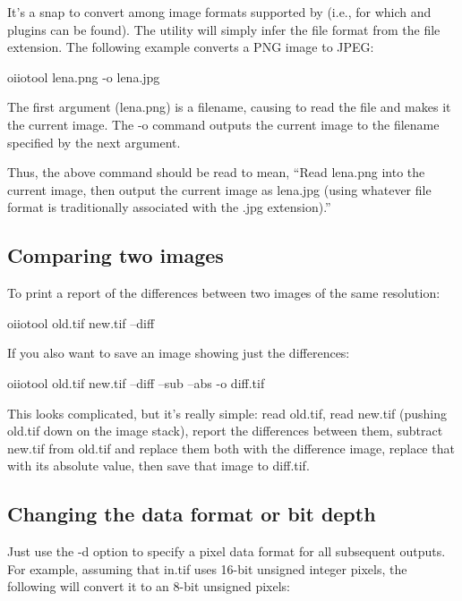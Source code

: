 It's a snap to convert among image formats supported by \product
(i.e., for which \ImageInput and \ImageOutput plugins can be found).
The \oiiotool utility will simply infer the file format from the
file extension. The following example converts a PNG image to JPEG:

\begin{code}
    oiiotool lena.png -o lena.jpg
\end{code}

The first argument ({\cf lena.png}) is a filename, causing \oiiotool to
read the file and makes it the current image.  The {\cf -o} command
outputs the current image to the filename specified by the next
argument.

Thus, the above command should be read to mean, ``Read {\cf lena.png}
into the current image, then output the current image as {\cf lena.jpg}
(using whatever file format is traditionally associated with the {\cf
  .jpg} extension).''


\subsection*{Comparing two images}

To print a report of the differences between two images of the same
resolution:

\begin{code}
    oiiotool old.tif new.tif --diff
\end{code}

\noindent If you also want to save an image showing just the differences:

\begin{code}
    oiiotool old.tif new.tif --diff --sub --abs -o diff.tif
\end{code}

This looks complicated, but it's really simple: read {\cf old.tif},
read {\cf new.tif} (pushing {\cf old.tif} down on the image stack),
report the differences between them, subtract {\cf new.tif} from 
{\cf old.tif} and replace them both with the difference image,
replace that with its absolute value, then save that image to 
{\cf diff.tif}.


\subsection*{Changing the data format or bit depth}

Just use the {\cf -d} option to specify a pixel data format for all
subsequent outputs.  For example, assuming that {\cf in.tif} uses 16-bit
unsigned integer pixels, the following will convert it to an 8-bit
unsigned pixels:

